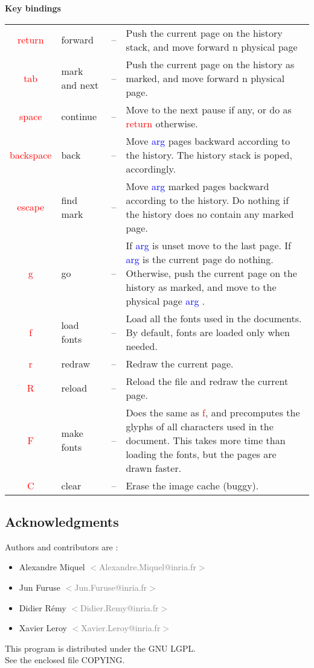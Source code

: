 \documentclass[12pt]{article}
\def\email#1{\textcolor{gray}{$<${#1}$>$ }}
\def\key#1{\textcolor{red}{#1}}
\def\ikey#1#2#3{\key{#1} & #2 & -- & #3\\}
\def\arg{\textcolor{blue}{arg }}
\begin{document}
\newpage

\Large
\begin{center}
\textbf{Key bindings}
\end{center}
\normalsize


\noindent
\begin{tabularx}{\linewidth}{clcX}
\ikey{return}{forward}
{Push the current page on the history stack, and move forward n physical page}
\ikey{tab}{mark and next}
{Push the current page on the history as marked, and move forward n physical page.}
\ikey{space}{continue}
{Move to the next pause if any, or do as \key{return} otherwise.}
\ikey{backspace}{back}
{Move \arg pages backward according to the history. The history stack is poped, accordingly.}
\ikey{escape}{find mark}
{Move \arg marked pages backward according to the history.
 Do nothing if the history does no contain any marked page.}
\ikey{g}{go}
{If \arg is unset move to the last page.
 If \arg is the current page do nothing.
 Otherwise, push the current page on the history as marked, and move
 to the physical page \arg.}
\ikey{f}{load fonts}{Load all the fonts used in the documents.  By default, fonts are loaded only when needed.}
\ikey{r}{redraw}{Redraw the current page.}
\ikey{R}{reload}{Reload the file and redraw the current page.}
\ikey{F}{make fonts}
{Does the same as \key{f}, and precomputes the glyphs of all characters used in the document.
This takes more time than loading the fonts, but the pages are drawn faster.}
\ikey{C}{clear}{Erase the image cache (buggy).}
\end{tabularx}


\newpage

\subsection*{Acknowledgments}

Authors and contributors are :

\begin{itemize}
\item Alexandre Miquel \email{Alexandre.Miquel@inria.fr}
\item Jun Furuse \email{Jun.Furuse@inria.fr}
\item Didier R\'emy \email{Didier.Remy@inria.fr}
\item Xavier Leroy \email{Xavier.Leroy@inria.fr}
\end{itemize}


\begin{center}
This program is distributed under the GNU LGPL. \\
See the enclosed file COPYING.
\end{center}

\end{document}
